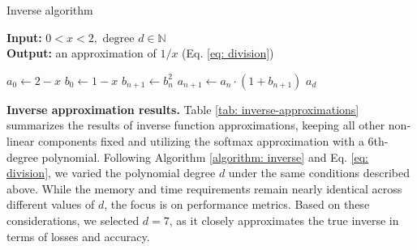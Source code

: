 \begin{algorithm}[t] 
    \caption{Inverse algorithm}\label{algorithm: inverse} 
    \textbf{Input:} $0 < x < 2, \text{ degree } d \in \mathbb{N}$ \\ 
    \textbf{Output:} an approximation of $1/x$ (Eq. \ref{eq: division})
    \begin{algorithmic}[1]
        \State $a_0 \gets 2 - x$ 
        \State $b_0 \gets 1 - x$ 
            \State $b_{n+1} \gets b_n^2$ 
            \State $a_{n+1} \gets a_n \cdot (1 + b_{n+1})$
        \EndFor 
        \State \Return $a_d$ 
    \end{algorithmic}
\end{algorithm}

\noindent \textbf{Inverse approximation results.} Table \ref{tab: inverse-approximations} summarizes the results of inverse function approximations, keeping all other non-linear components fixed and utilizing the softmax approximation with a $6$th-degree polynomial. Following Algorithm \ref{algorithm: inverse} and Eq. \ref{eq: division}, we varied the polynomial degree $d$ under the same conditions described above. While the memory and time requirements remain nearly identical across different values of $d$, the focus is on performance metrics. Based on these considerations, we selected $d=7$, as it closely approximates the true inverse in terms of losses and accuracy. 